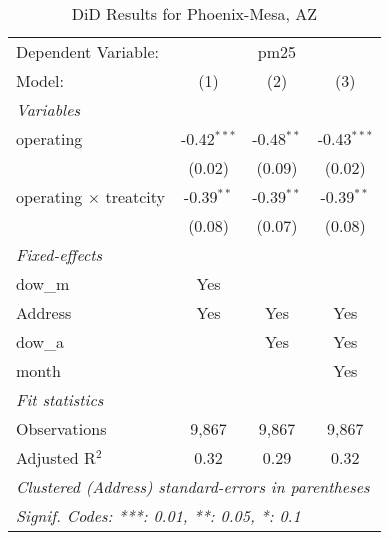 
\begin{table}[htbp]
   \caption{DiD Results for Phoenix-Mesa, AZ}
   \centering
   \begin{tabular}{lccc}
      \tabularnewline \midrule \midrule
      Dependent Variable: & \multicolumn{3}{c}{pm25}\\
      Model:                        & (1)           & (2)          & (3)\\  
      \midrule
      \emph{Variables}\\
      operating                     & -0.42$^{***}$ & -0.48$^{**}$ & -0.43$^{***}$\\   
                                    & (0.02)        & (0.09)       & (0.02)\\   
      operating $\times$ treatcity  & -0.39$^{**}$  & -0.39$^{**}$ & -0.39$^{**}$\\   
                                    & (0.08)        & (0.07)       & (0.08)\\   
      \midrule
      \emph{Fixed-effects}\\
      dow\_m                        & Yes           &              & \\  
      Address                       & Yes           & Yes          & Yes\\  
      dow\_a                        &               & Yes          & Yes\\  
      month                         &               &              & Yes\\  
      \midrule
      \emph{Fit statistics}\\
      Observations                  & 9,867         & 9,867        & 9,867\\  
      Adjusted R$^2$                & 0.32          & 0.29         & 0.32\\  
      \midrule \midrule
      \multicolumn{4}{l}{\emph{Clustered (Address) standard-errors in parentheses}}\\
      \multicolumn{4}{l}{\emph{Signif. Codes: ***: 0.01, **: 0.05, *: 0.1}}\\
   \end{tabular}
\end{table}


